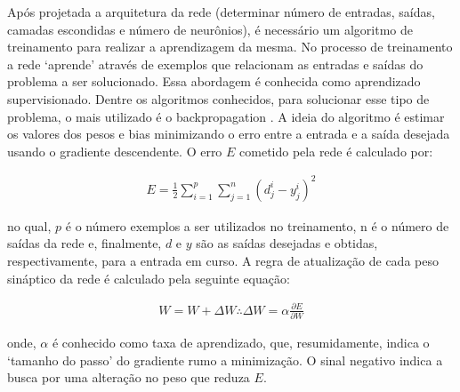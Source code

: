 Após projetada a arquitetura da rede (determinar número de entradas, saídas, camadas escondidas e número de neurônios), é necessário um algoritmo de treinamento para realizar a aprendizagem da mesma. No processo de treinamento a rede ‘aprende’ através de exemplos que relacionam as entradas e saídas do problema a ser solucionado. Essa abordagem é conhecida como aprendizado supervisionado. Dentre os algoritmos conhecidos, para solucionar esse tipo de problema, o mais utilizado é o backpropagation \cite{rumelhart1986learning}. A ideia do algoritmo é estimar os valores dos pesos e bias minimizando o erro entre a entrada e a saída desejada usando o gradiente descendente. O erro \(E\) cometido pela rede é calculado por:

\begin{equation} \label{eqRNA3}
\begin{split}
E = \frac{1}{2} \sum_{i=1}^{p} \sum_{j=1}^{n} (d_{j}^{i} - y_{j}^{i})^2
\end{split}
\end{equation}

no qual, \(p\) é o número exemplos a ser utilizados no treinamento, n é o número de saídas da rede e, finalmente, \(d\) e \(y\) são as saídas desejadas e obtidas, respectivamente, para a entrada em curso.
A regra de atualização de cada peso sináptico da rede é calculado pela seguinte equação:

\begin{equation} \label{eqRNA4}
\begin{split}
W = W + \Delta W \therefore \Delta W = \alpha\frac{\partial E}{\partial W}
\end{split}
\end{equation}

onde, \(\alpha\) é conhecido como taxa de aprendizado, que, resumidamente, indica o ‘tamanho do passo’ do gradiente rumo a minimização. O sinal negativo indica a busca por uma alteração no peso que reduza \(E\).
